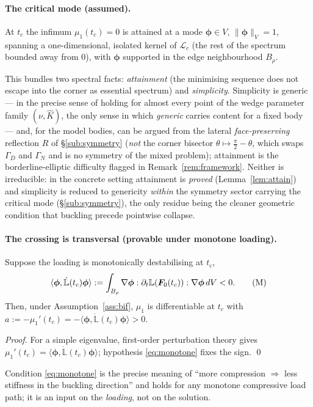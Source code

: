 \paragraph{The critical mode (assumed).}
\begin{assumption}
    \label{ass:bif}
    At $t_c$ the infimum $\mu_1(t_c)=0$ is attained at a mode $\bm{\phi}\in V$, $\|\bm{\phi}\|_V=1$, spanning a
    one-dimensional, isolated kernel of $\mathcal{L}_c$ (the rest of the spectrum bounded away from $0$), with
    $\bm{\phi}$ supported in the edge neighbourhood $B_\rho$.
\end{assumption}
\noindent This bundles two spectral facts: \emph{attainment} (the minimising sequence does not escape into the
corner as essential spectrum) and \emph{simplicity}. Simplicity is generic --- in the precise sense of holding for
almost every point of the wedge parameter family $(\nu,\hat K)$, the only sense in which \emph{generic} carries
content for a fixed body --- and, for the model bodies, can be argued
from the lateral \emph{face-preserving} reflection $R$ of \S\ref{sub:symmetry} (\emph{not} the corner bisector
$\theta\mapsto\tfrac\pi2-\theta$, which swaps $\Gamma_D$ and $\Gamma_N$ and is no symmetry of the mixed problem);
attainment is the borderline-elliptic difficulty flagged in
Remark~\ref{rem:framework}. Neither is irreducible: in the concrete setting attainment is \emph{proved}
(Lemma~\ref{lem:attain}) and simplicity is reduced to genericity \emph{within} the symmetry sector carrying the
critical mode (\S\ref{sub:symmetry}), the only residue being the cleaner geometric condition that buckling
precede pointwise collapse.

\paragraph{The crossing is transversal (provable under monotone loading).}
\begin{lemma}[Transversality]
    \label{lem:transversal}
    Suppose the loading is monotonically destabilising at $t_c$,
    \begin{equation}
        \label{eq:monotone}
        \langle\bm{\phi},\dot{\mathbb{L}}(t_c)\bm{\phi}\rangle
        := \int_{B_\rho}\nabla\bm{\phi}:\partial_t\mathbb{L}(\bm{F}_0(t_c)):\nabla\bm{\phi}\,dV < 0 . \tag{M}
    \end{equation}
    Then, under Assumption~\ref{ass:bif}, $\mu_1$ is differentiable at $t_c$ with
    $a:=-\mu_1'(t_c)=-\langle\bm{\phi},\dot{\mathbb{L}}(t_c)\bm{\phi}\rangle>0$.
\end{lemma}
\begin{proof}
    For a simple eigenvalue, first-order perturbation theory gives $\mu_1'(t_c)=\langle\bm{\phi},\dot{\mathbb{L}}(t_c)\bm{\phi}\rangle$;
    hypothesis \eqref{eq:monotone} fixes the sign. \qed
\end{proof}
\noindent Condition \eqref{eq:monotone} is the precise meaning of ``more compression $\Rightarrow$ less stiffness in
the buckling direction'' and holds for any monotone compressive load path; it is an input on the \emph{loading}, not on
the solution.

